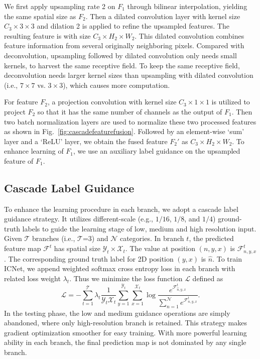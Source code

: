 \documentclass[runningheads]{llncs}
\begin{document}
We first apply upsampling rate 2 on $F_1$ through bilinear interpolation, yielding the same spatial size as $F_2$. Then a dilated convolution layer with kernel size $C_3 \times 3 \times 3$ and dilation 2 is applied to refine the upsampled features. The resulting feature is with size $C_3 \times H_2 \times W_2$. This dilated convolution combines feature information from several originally neighboring pixels. Compared with deconvolution, upsampling followed by dilated convolution only needs small kernels, to harvest the same receptive field. To keep the same receptive field, deconvolution needs larger kernel sizes than upsampling with dilated convolution (i.e., $7 \times 7$ vs. $3 \times 3$), which causes more computation.

For feature $F_2$, a projection convolution with kernel size $C_3 \times 1 \times 1$ is utilized to project $F_2$ so that it has the same number of channels as the output of $F_1$. Then two batch normalization layers are used to normalize these two processed features as shown in Fig.~\ref{fig:cascadefeaturefusion}. Followed by an element-wise `sum' layer and a `ReLU' layer, we obtain the fused feature
$F_2'$ as $C_3 \times H_2 \times W_2$. To enhance learning of $F_1$, we use an auxiliary label guidance on the upsampled feature of $F_1$.

\subsection{Cascade Label Guidance}\label{sec:clg}
To enhance the learning procedure in each branch, we adopt a cascade label guidance strategy. It utilizes different-scale (e.g., $1/16$, $1/8$, and $1/4$) ground-truth labels to guide the learning stage of low, medium and high resolution input. Given $\mathcal{T}$ branches (i.e., $\mathcal{T}$=3) and $\mathcal{N}$ categories. In branch $t$, the predicted feature map $\mathcal{F}^t$ has spatial size $\mathcal{Y}_t \times \mathcal{X}_t$. The value at position $(n,y,x)$ is $\mathcal{F}^{t}_{n,y,x}$. The corresponding ground truth label for 2D position $(y,x)$ is $\hat{n}$. To train ICNet, we append weighted softmax cross entropy loss in each branch with related loss weight $\lambda_t$. Thus we minimize the loss function $\mathcal{L}$ defined as
\begin{equation}\label{eq:loss}
	\mathcal{L} = - \sum_{t=1}^{\mathcal{T}}\lambda_t\frac{1}{\mathcal{Y}_t \mathcal{X}_t}\sum_{y=1}^{\mathcal{Y}_t}\sum_{x=1}^{\mathcal{X}_t}\log{\frac{e^{\mathcal{F}^{t}_{\hat{n},y,x}}}{\sum_{n=1}^{\mathcal{N}} e^{\mathcal{F}^{t}_{n,y,x}}}}.
\end{equation}
In the testing phase, the low and medium guidance operations are simply abandoned, where only high-resolution branch is retained. 
This strategy makes gradient optimization smoother for easy training. With more powerful learning ability in each branch, the final prediction map is not dominated by any single branch. 
\end{document}
